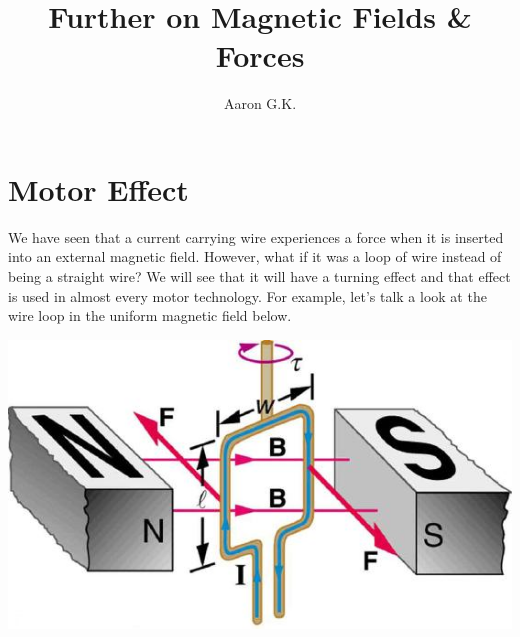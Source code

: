 \documentclass[9pt]{article}
\title{Further on Magnetic Fields \& Forces}
\author{Aaron G.K.}
\begin{document}
	\maketitle
		\section*{Motor Effect}
		We have seen that a current carrying wire experiences a force when it is inserted into an external magnetic field. However, what if it was a loop of wire instead of being a straight wire? We will see that it will have a turning effect and that effect is used in almost every motor technology. For example, let's talk a look at the wire loop in the uniform magnetic field below.
		\begin{center}
			\includegraphics[scale=0.4]{torque_current_loop.jpg}
		\end{center}
\end{document}
